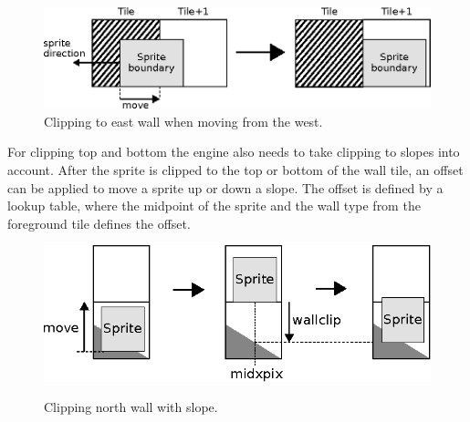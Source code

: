 \documentclass[book.tex]{subfiles}
\begin{document}
\begin{figure}[H]
  \centering
  \includegraphics[width=\textwidth]{imgs/drawings/clipping_east.eps}
  \caption{Clipping to east wall when moving from the west.}
  \label{fig:clipping_east}  
\end{figure}

\par
\begin{minipage}{\textwidth}
  
\end{minipage}
\label{wallclip_array}
\par
For clipping top and bottom the engine also needs to take clipping to slopes into account. After the sprite is clipped to the top or bottom of the wall tile, an offset can be applied to move a sprite up or down a slope. The offset is defined by a lookup table, where the midpoint of the sprite and the wall type from the foreground tile defines the offset.

\begin{figure}[H]
  \centering
  \includegraphics[width=\textwidth]{imgs/drawings/clipping_north.eps}
  \label{fig:clipping_north}
  \caption{Clipping north wall with slope.}
\end{figure}
\end{document}
